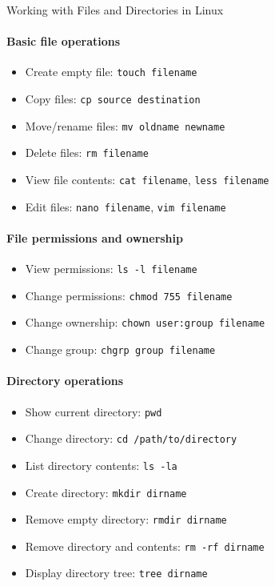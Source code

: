 \begin{KR}{Working with Files and Directories in Linux}

    \begin{minipage}{0.5\linewidth}
    \paragraph{Basic file operations}
    \begin{itemize}
        \item Create empty file: \texttt{touch filename}
        \item Copy files: \texttt{cp source destination}
        \item Move/rename files: \texttt{mv oldname newname}
        \item Delete files: \texttt{rm filename}
        \item View file contents: \texttt{cat filename}, \texttt{less filename}
        \item Edit files: \texttt{nano filename}, \texttt{vim filename}
    \end{itemize}
    
    \paragraph{File permissions and ownership}
    \begin{itemize}
        \item View permissions: \texttt{ls -l filename}
        \item Change permissions: \texttt{chmod 755 filename}
        \item Change ownership: \texttt{chown user:group filename}
        \item Change group: \texttt{chgrp group filename}
    \end{itemize}
    \end{minipage}
    \begin{minipage}{0.5\linewidth}    
    \paragraph{Directory operations}
    \begin{itemize}
        \item Show current directory: \texttt{pwd}
        \item Change directory: \texttt{cd /path/to/directory}
        \item List directory contents: \texttt{ls -la}
        \item Create directory: \texttt{mkdir dirname}
        \item Remove empty directory: \texttt{rmdir dirname}
        \item Remove directory and contents: \texttt{rm -rf dirname}
        \item Display directory tree: \texttt{tree dirname}
    \end{itemize}
    

\end{minipage}
\end{KR}
